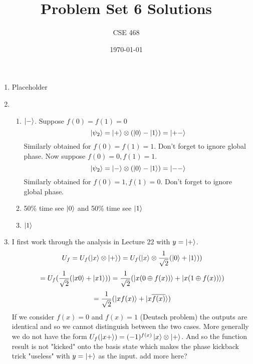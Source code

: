 \documentclass[12pt]{article}
\title{Problem Set 6 Solutions}
\author{CSE 468}
\date{\today}
\begin{document}
\maketitle

\begin{enumerate}[font=\bfseries]
    \item Placeholder
    \item \begin{enumerate}
        \item $\ket{-}$. Suppose $f(0) = f(1) = 0$
        \[\ket{\psi_2} = \ket{+} \otimes (\ket{0} - \ket{1}) = \ket{+-}\]
        Similarly obtained for $f(0) = f(1) = 1$. Don't forget to ignore global phase.
        Now suppose $f(0) = 0, f(1) = 1$.
        \[\ket{\psi_2} = \ket{-} \otimes (\ket{0} - \ket{1}) = \ket{--}\]
        Similarly obtained for $f(0) = 1, f(1) = 0$. Don't forget to ignore global phase.
        \item 50\% time see $\ket{0}$ and 50\% time see $\ket{1}$
        \item $\ket{1}$
    \end{enumerate}
    \item I first work through the analysis in Lecture 22 with $y=\ket{+}$.
    \[U_f = U_f(\ket{x}\otimes\ket{+}) = U_f(\ket{x}\otimes\frac{1}{\sqrt{2}}(\ket{0}+\ket{1}))\]
    \[=U_f(\frac{1}{\sqrt{2}}(\ket{x0}+\ket{x1})) = 
    \frac{1}{\sqrt{2}}(\ket{x(0\oplus f(x))}+ \ket{x(1\oplus f(x))})\]
    \[= \frac{1}{\sqrt{2}}(\ket{xf(x)}+\ket{x\overline{f(x)}})\]
    If we consider $f(x) = 0$ and $f(x) = 1$ (Deutsch problem) the outputs are identical and so we cannot distinguish between the two cases. More generally we do not have the form $U_f(\ket{x+}) = (-1)^{f(x)} \ket{x} \otimes \ket{+}$. And so the function result is not "kicked" onto the basis state which makes the phase kickback trick "useless" with $y = \ket{+}$ as the input. add more here?
\end{enumerate}
\end{document}

